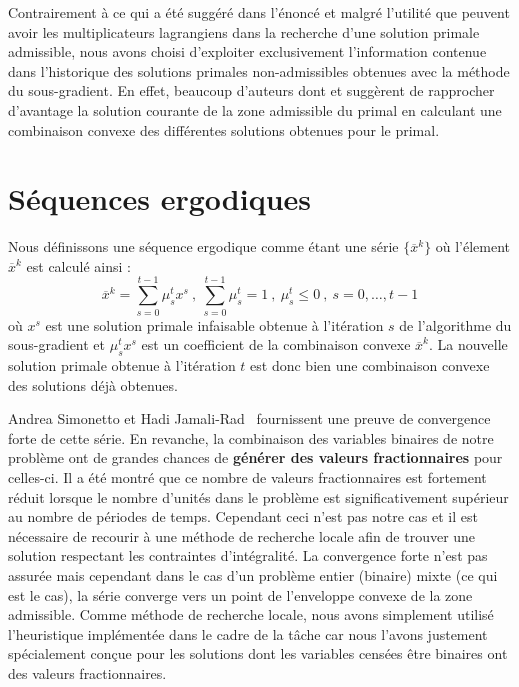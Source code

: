 \vspace*{1.2cm}

Contrairement à ce qui a été suggéré dans l'énoncé et malgré l'utilité que peuvent avoir les multiplicateurs lagrangiens
dans la recherche d'une solution primale admissible, nous avons choisi d'exploiter exclusivement l'information
contenue dans l'historique des solutions primales non-admissibles obtenues avec la méthode du sous-gradient.
En effet, beaucoup d'auteurs dont \citep{doi:10.1137/S1052623498332336} et \citep{Zhuang1988}
suggèrent de rapprocher d'avantage la solution courante de la zone admissible du primal en calculant une combinaison
convexe des différentes solutions obtenues pour le primal.

\section{Séquences ergodiques}

Nous définissons une séquence ergodique comme étant une série $\{\overline{x}^k\}$ où l'élement $\overline{x}^k$
est calculé ainsi \citep{Aldenvik}:
\begin{equation}
    \overline{x}^k = \sum\limits_{s=0}^{t-1} \mu_s^t x^s \ , \ \sum\limits_{s=0}^{t-1} \mu_s^t = 1 \ , \ \mu_s^t \le 0 \ , \ s = 0, \ldots, t-1
\end{equation}
où $x^s$ est une solution primale infaisable obtenue à l'itération $s$ de l'algorithme du sous-gradient et $\mu_s^t x^s$ est un coefficient
de la combinaison convexe $\overline{x}^k$. La nouvelle solution primale obtenue à l'itération $t$ est donc bien une combinaison convexe 
des solutions déjà obtenues.

Andrea Simonetto et Hadi Jamali-Rad~\citep{Simonetto2016} fournissent une preuve de convergence forte de cette série.
En revanche, la combinaison des variables binaires de notre problème ont de grandes chances de \textbf{générer des valeurs fractionnaires} pour
celles-ci. Il a été montré que ce nombre de valeurs fractionnaires est fortement réduit lorsque le nombre d'unités dans le problème
est significativement supérieur au nombre de périodes de temps. Cependant ceci n'est pas notre cas et il est nécessaire de recourir à une 
méthode de recherche locale afin de trouver une solution respectant les contraintes d'intégralité.
La convergence forte n'est pas assurée mais cependant dans le cas d'un problème entier (binaire) mixte (ce qui est le cas), la série converge vers 
un point de l'enveloppe convexe de la zone admissible.
Comme méthode de recherche locale, nous avons simplement utilisé l'heuristique implémentée dans le cadre de la tâche car nous l'avons
justement spécialement conçue pour les solutions dont les variables censées être binaires ont des valeurs fractionnaires.


